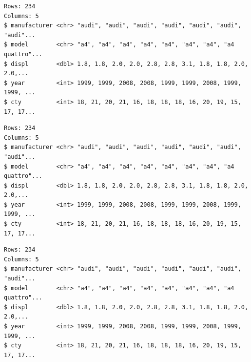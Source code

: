 \documentclass[
  11pt,
]{krantz}
\newenvironment{Shaded}{\begin{snugshade}}{\end{snugshade}}
\newcommand{\CommentTok}[1]{\textcolor[rgb]{0.37,0.37,0.37}{\textit{#1}}}
\newcommand{\KeywordTok}[1]{\textcolor[rgb]{0.27,0.27,0.27}{\textbf{#1}}}
\newcommand{\NormalTok}[1]{#1}
\newcommand{\OperatorTok}[1]{\textcolor[rgb]{0.43,0.43,0.43}{\textbf{#1}}}
\newcommand{\StringTok}[1]{\textcolor[rgb]{0.5,0.5,0.5}{#1}}
\begin{document}
\begin{verbatim}
Rows: 234
Columns: 5
$ manufacturer <chr> "audi", "audi", "audi", "audi", "audi", "audi", "audi"...
$ model        <chr> "a4", "a4", "a4", "a4", "a4", "a4", "a4", "a4 quattro"...
$ displ        <dbl> 1.8, 1.8, 2.0, 2.0, 2.8, 2.8, 3.1, 1.8, 1.8, 2.0, 2.0,...
$ year         <int> 1999, 1999, 2008, 2008, 1999, 1999, 2008, 1999, 1999, ...
$ cty          <int> 18, 21, 20, 21, 16, 18, 18, 18, 16, 20, 19, 15, 17, 17...
\end{verbatim}

\begin{Shaded}
\end{Shaded}

\begin{verbatim}
Rows: 234
Columns: 5
$ manufacturer <chr> "audi", "audi", "audi", "audi", "audi", "audi", "audi"...
$ model        <chr> "a4", "a4", "a4", "a4", "a4", "a4", "a4", "a4 quattro"...
$ displ        <dbl> 1.8, 1.8, 2.0, 2.0, 2.8, 2.8, 3.1, 1.8, 1.8, 2.0, 2.0,...
$ year         <int> 1999, 1999, 2008, 2008, 1999, 1999, 2008, 1999, 1999, ...
$ cty          <int> 18, 21, 20, 21, 16, 18, 18, 18, 16, 20, 19, 15, 17, 17...
\end{verbatim}

\begin{Shaded}
\end{Shaded}

\begin{verbatim}
Rows: 234
Columns: 5
$ manufacturer <chr> "audi", "audi", "audi", "audi", "audi", "audi", "audi"...
$ model        <chr> "a4", "a4", "a4", "a4", "a4", "a4", "a4", "a4 quattro"...
$ displ        <dbl> 1.8, 1.8, 2.0, 2.0, 2.8, 2.8, 3.1, 1.8, 1.8, 2.0, 2.0,...
$ year         <int> 1999, 1999, 2008, 2008, 1999, 1999, 2008, 1999, 1999, ...
$ cty          <int> 18, 21, 20, 21, 16, 18, 18, 18, 16, 20, 19, 15, 17, 17...
\end{verbatim}
\end{document}
